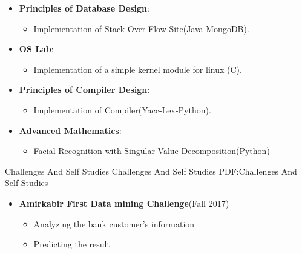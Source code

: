 \documentclass[letterpaper,MMMyyyy,nonstopmode]{simpleresumecv}
\begin{document}
\begin{Body}
\begin{itemize}
\begin{itemize}
		\end{itemize}
		
	\item \textbf{Principles of Database Design}:
		\begin{itemize}
		\item Implementation of Stack Over Flow Site(Java-MongoDB).
     	      
		\end{itemize}
	
	\item \textbf{OS Lab}:
		\begin{itemize}
		\item Implementation of a simple kernel module for linux (C).
		\end{itemize}
	
	\item \textbf{Principles of Compiler Design}:
		\begin{itemize}
		\item Implementation of Compiler(Yacc-Lex-Python).
     	      
		\end{itemize}
	
		
    \item \textbf{Advanced Mathematics}: 
	    \begin{itemize}
        \item Facial Recognition with Singular Value Decomposition(Python)
     \end{itemize}
      \end{itemize}	
   
   
       	



\Section
{Challenges And Self Studies}
{Challenges And Self Studies}
{PDF:Challenges And Self Studies}

\Entry
\begin{itemize}

\item \textbf {Amirkabir First Data mining Challenge}(Fall 2017)
    	
   \begin{itemize}
	   
     \item Analyzing the bank customer's  information
     \item Predicting the result
   
    \end{itemize}
	

\end{itemize}
\end{Body}
\end{document}
